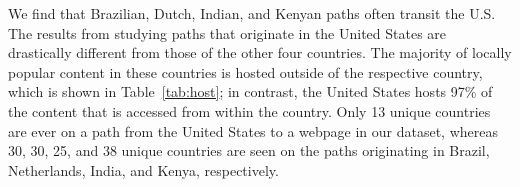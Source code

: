 We find that Brazilian, Dutch, Indian, and Kenyan paths
often transit the U.S. The results from
studying paths that originate in the United States are drastically different from
those
of the other four countries.  The majority of locally popular content in these countries
is hosted outside of the respective country, which is shown in Table~\ref{tab:host}; in contrast, the United States hosts
97\% of the
content that is accessed from within the country.  Only 13 unique countries
are ever on a path from the United States to a webpage in our dataset, whereas 30, 30, 25, and 38 unique countries are seen on the paths
originating in Brazil, Netherlands, India, and Kenya, respectively.







